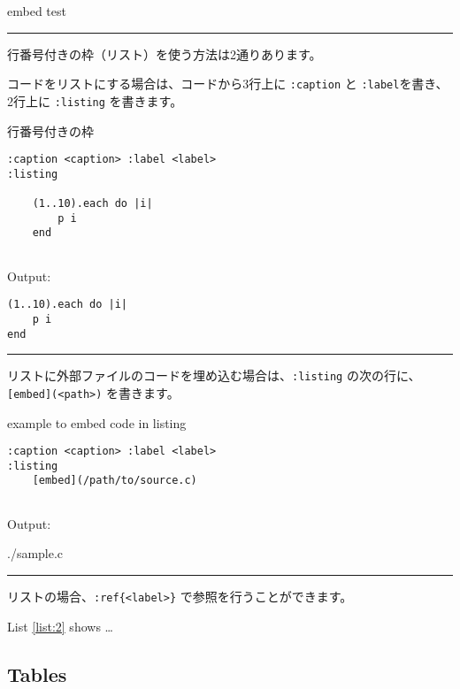 \documentclass[a4j, titlepage]{jarticle}
\begin{document}
\begin{itembox}[c]{embed test}
{\small

}
\end{itembox}

\begin{center}
\rule{3in}{0.4pt}
\end{center}

行番号付きの枠（リスト）を使う方法は2通りあります。

コードをリストにする場合は、コードから3行上に {\tt :caption} と {\tt :label}を書き、2行上に {\tt :listing} を書きます。

\begin{itembox}[c]{行番号付きの枠}
\begin{verbatim}
:caption <caption> :label <label>
:listing

    (1..10).each do |i|
        p i
    end
　
\end{verbatim}
\end{itembox}

Output:
　
\begin{lstlisting}[caption=iterate ,label=list:1]
(1..10).each do |i|
	p i
end
\end{lstlisting}

\begin{center}
\rule{3in}{0.4pt}
\end{center}

リストに外部ファイルのコードを埋め込む場合は、{\tt :listing} の次の行に、{\tt [embed](\textless{}path\textgreater{})} を書きます。

\begin{itembox}[c]{example to embed code in listing}
\begin{verbatim}
:caption <caption> :label <label>
:listing
    [embed](/path/to/source.c)
　
\end{verbatim}
\end{itembox}

Output:


{./sample.c}

\begin{center}
\rule{3in}{0.4pt}
\end{center}

リストの場合、{\tt :}{\tt ref\{\textless{}label\textgreater{}\}} で参照を行うことができます。

List \ref{list:2} shows \ldots{}

\subsection{Tables}
\end{document}
